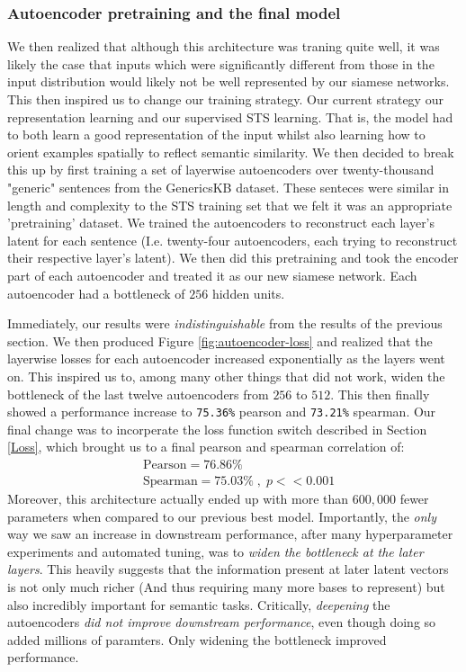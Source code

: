 \documentclass[14pt]{article}
\begin{document}
\subsubsection{Autoencoder pretraining and the final model}
We then realized that although this architecture was traning quite well, it was likely the case that inputs which were significantly different from those in the input distribution would likely not be well represented by our siamese networks. This then inspired us to change our training strategy. Our current strategy  our representation learning and our supervised STS learning. That is, the model had to both learn a good representation of the input whilst also learning how to orient examples spatially to reflect semantic similarity. We then decided to break this up by first training a set of layerwise autoencoders over twenty-thousand "generic" sentences from the GenericsKB \cite{bhakthavatsalam2020genericskbknowledgebasegeneric} dataset. These senteces were similar in length and complexity to the STS training set that we felt it was an appropriate 'pretraining' dataset. We trained the autoencoders to reconstruct each layer's latent for each sentence (I.e. twenty-four autoencoders, each trying to reconstruct their respective layer's latent). We then did this pretraining and took the encoder part of each autoencoder and treated it as our new siamese network. Each autoencoder had a bottleneck of $256$ hidden units.

Immediately, our results were \textit{indistinguishable} from the results of the previous section. We then produced Figure \ref{fig:autoencoder-loss} and realized that the layerwise losses for each autoencoder increased exponentially as the layers went on. This inspired us to, among many other things that did not work, widen the bottleneck of the last twelve autoencoders from $256$ to $512$. This then finally showed a performance increase to \verb|75.36%| pearson and \verb|73.21%| spearman. Our final change was to incorperate the loss function switch described in Section \ref{Loss}, which brought us to a final pearson and spearman correlation of:
\begin{align*}
    &\text{Pearson} = 76.86\%\\
    &\text{Spearman} = 75.03\%\;,\; p << 0.001
\end{align*}
Moreover, this architecture actually ended up with more than $600,000$ fewer parameters when compared to our previous best model. Importantly, the \textit{only} way we saw an increase in downstream performance, after many hyperparameter experiments and automated tuning, was to \textit{widen the bottleneck at the later layers}. This heavily suggests that the information present at later latent vectors is not only much richer (And thus requiring many more bases to represent) but also incredibly important for semantic tasks. Critically, \textit{deepening} the autoencoders \textit{did not improve downstream performance}, even though doing so added millions of paramters. Only widening the bottleneck improved performance.
\end{document}
